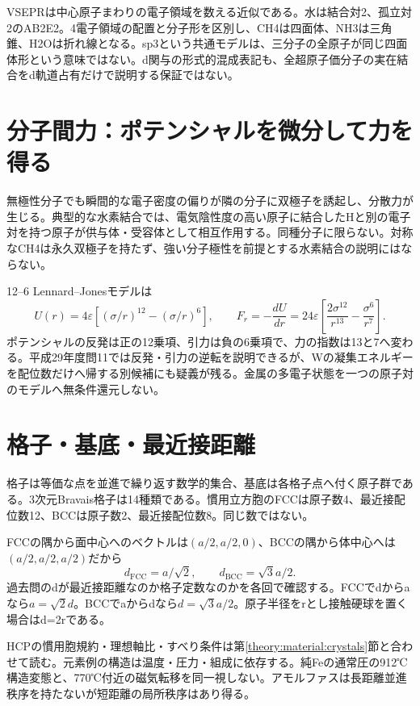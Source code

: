 VSEPRは中心原子まわりの電子領域を数える近似である。水は結合対2、孤立対2のAB2E2。4電子領域の配置と分子形を区別し、CH4は四面体、NH3は三角錐、H2Oは折れ線となる。sp3という共通モデルは、三分子の全原子が同じ四面体形という意味ではない。d関与の形式的混成表記も、全超原子価分子の実在結合をd軌道占有だけで説明する保証ではない。

\section{分子間力：ポテンシャルを微分して力を得る}\label{theory:atomic:interactions}
無極性分子でも瞬間的な電子密度の偏りが隣の分子に双極子を誘起し、分散力が生じる。典型的な水素結合では、電気陰性度の高い原子に結合したHと別の電子対を持つ原子が供与体・受容体として相互作用する。同種分子に限らない\cite{atomic_nonbond}。対称なCH4は永久双極子を持たず、強い分子極性を前提とする水素結合の説明にはならない。

12--6 Lennard--Jonesモデルは
\[
 U(r)=4\varepsilon\left[(\sigma/r)^{12}-(\sigma/r)^6\right],\qquad
 F_r=-\frac{dU}{dr}=24\varepsilon\left[\frac{2\sigma^{12}}{r^{13}}-\frac{\sigma^6}{r^7}\right].
\]
ポテンシャルの反発は正の12乗項、引力は負の6乗項で、力の指数は13と7へ変わる\cite{atomic_lj}。平成29年度問11では反発・引力の逆転を説明できるが、Wの凝集エネルギーを配位数だけへ帰する別候補にも疑義が残る。金属の多電子状態を一つの原子対のモデルへ無条件還元しない。

\section{格子・基底・最近接距離}\label{theory:atomic:geometry}
格子は等価な点を並進で繰り返す数学的集合、基底は各格子点へ付く原子群である。3次元Bravais格子は14種類である\cite{atomic_bravais_ref}。慣用立方胞のFCCは原子数4、最近接配位数12、BCCは原子数2、最近接配位数8。同じ数ではない\cite{openstax_crystals}。

FCCの隅から面中心へのベクトルは\((a/2,a/2,0)\)、BCCの隅から体中心へは\((a/2,a/2,a/2)\)だから
\[
 d_{\mathrm{FCC}}=a/\sqrt2,\qquad d_{\mathrm{BCC}}=\sqrt3a/2.
\]
過去問のdが最近接距離なのか格子定数なのかを各回で確認する。FCCでdからaなら\(a=\sqrt2d\)。BCCでaからdなら\(d=\sqrt3a/2\)。原子半径をrとし接触硬球を置く場合はd=2rである。

HCPの慣用胞規約・理想軸比・すべり条件は第\ref{theory:material:crystals}節と合わせて読む。元素例の構造は温度・圧力・組成に依存する。純Feの通常圧の912℃構造変態と、770℃付近の磁気転移を同一視しない。アモルファスは長距離並進秩序を持たないが短距離の局所秩序はあり得る。

